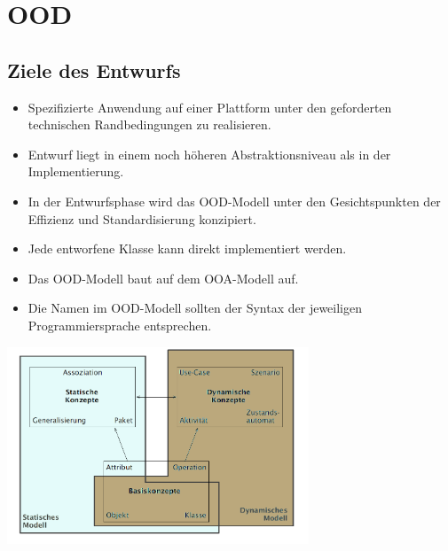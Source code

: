 \section{OOD }
\subsection{Ziele des Entwurfs}
  \begin{itemize}[leftmargin=0.5cm]
    \item Spezifizierte Anwendung auf einer Plattform unter den geforderten technischen Randbedingungen zu realisieren.
    \item Entwurf liegt in einem noch höheren Abstraktionsniveau als in der Implementierung.
    \item In der Entwurfsphase wird das OOD-Modell unter den Gesichtspunkten
      der Effizienz und Standardisierung konzipiert.
    \item Jede entworfene Klasse kann direkt implementiert werden.
    \item Das OOD-Modell baut auf dem OOA-Modell auf.
    \item Die Namen im OOD-Modell sollten der Syntax der jeweiligen Programmiersprache entsprechen.
  \end{itemize}

  \parbox{9cm}{\includegraphics[width=9cm]{./images/Konzepte.png}}
  
